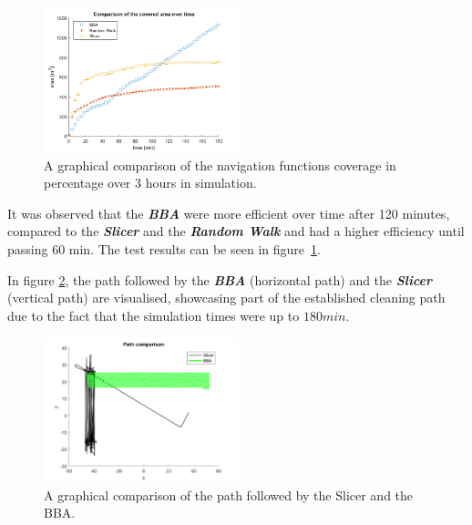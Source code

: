 \begin{figure}[H]
    \captionsetup{justification=centering}
    \centering
    \includegraphics[width=0.5\textwidth]{Figures/comparison/oneArea.png}
    \caption{A graphical comparison of the navigation functions coverage in percentage over 3 hours in simulation.}
    \label{fig:results_graph}
\end{figure}


It was observed that the \textit{\textbf{BBA}} were more efficient over time after 120 minutes, compared to the \textbf{\textit{Slicer}} and the \textbf{\textit{Random Walk}} and had a higher efficiency until passing 60 min.
The test results can be seen in figure~\ref{fig:results_graph}.

In figure \ref{fig:path}, the path followed by the \textit{\textbf{BBA}} (horizontal path) and the \textbf{\textit{Slicer}} (vertical path) are visualised, showcasing part of the established cleaning path due to the fact that the simulation times were up to $180 min$.

\begin{figure}[H]
    \captionsetup{justification=centering}
    \centering
    \includegraphics[width=0.5\textwidth]{Figures/comparison/path.png}
    \caption{A graphical comparison of the path followed by the Slicer and the BBA.}
    \label{fig:path}
\end{figure}